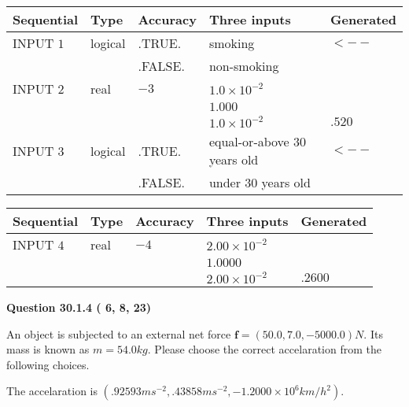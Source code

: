 \documentclass[12pt]{article}
\begin{document}
   
  
  
\noindent\begin{tabular}{|l|l|l|l|l|}
\hline
 Sequential & Type & Accuracy & Three inputs & Generated \\ 
\hline
 
 
  INPUT $           1$ & logical & .TRUE. & 
 smoking & 
  $ <-- $ 
  \\
  & & .FALSE. & 
  non-smoking & 
 \\  \hline  
 
 
  INPUT $           2$ & real & $          -3 $ & $
 1.0 \times 10^{-2}
  $ & \\
  & & &  $
 1.000
  $ & \\
  & & &  $
 1.0 \times 10^{-2}
 $ & $ .520 $ 
 \\  \hline  
 
 
  INPUT $           3$ & logical & .TRUE. & 
 equal-or-above 30 years old & 
  $ <-- $ 
  \\
  & & .FALSE. & 
  under 30 years old & 
 \\  \hline  
 \end{tabular}
   
   
  
  
\noindent\begin{tabular}{|l|l|l|l|l|}
\hline
 Sequential & Type & Accuracy & Three inputs & Generated \\ 
\hline
 
 
  INPUT $           4$ & real & $          -4 $ & $
 2.00 \times 10^{-2}
  $ & \\
  & & &  $
 1.0000
  $ & \\
  & & &  $
 2.00 \times 10^{-2}
 $ & $ .2600 $ 
 \\  \hline  
 \end{tabular}
   
   
  
\vspace{0.2in}
  
{\textbf{\Large{Question
30.1.4 
 (          6,          8,         23)
}}}
  
  
 
An object is subjected to an external net force $\mathbf{f}=(
50.0 ,
7.0,
-5000.0  )N$. Its mass is known as
$m= %
54.0  kg$. Please choose the correct accelaration
from the following choices.
 
 
 
The accelaration is
$(
.92593ms^{-2},
.43858ms^{-2},
-1.2000 \times 10^{6}km/h^2
).
$
 
\end{document}
